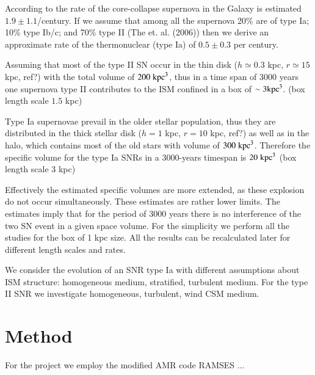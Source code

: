\documentclass[referee,oldversion]{aa}
\begin{document}
According to \citet{diehl:06} the rate of the core-collapse supernova in the Galaxy is estimated $1.9\pm1.1$/century. If we assume that among all the supernova 20\% are of type Ia;  10\% type Ib/c;  and 70\% type II (The et. al. (2006)) then we derive an approximate rate of the thermonuclear (type Ia) of $0.5\pm0.3$ per century. 


Assuming that most of the type II SN occur in the thin disk ($h \simeq 0.3$ kpc, $r \simeq 15$ kpc, ref?) with the total volume of $200 \; \mathrm{kpc}^3$, thus in a time span of 3000 years one supernova type II contributes to the ISM confined in a box of $\sim 3 \mathrm{kpc}^3$. (box length scale  $1.5$ kpc) 

Type Ia supernovae prevail in the older stellar population, thus they are distributed in the thick stellar disk ($h=1$ kpc, $r = 10$ kpc, ref?) as well as in the halo, which contains most of the old stars with volume of $300 \; \mathrm{kpc}^3$. Therefore the specific volume for the type Ia SNRs in a 3000-years timespan is $20 \; \mathrm{kpc}^3$ (box length scale $3$ kpc)

Effectively the estimated specific volumes are more extended, as these explosion do not occur simultaneously. These estimates are rather lower limits. The estimates imply that for the period of 3000 years there is no interference of the two SN event in a given space volume. For the simplicity we perform all the studies for the box of 1 kpc size. All the results can be recalculated later for different length scales and rates.

We consider the evolution of an SNR type Ia with different assumptions about ISM structure: homogeneous medium, stratified, turbulent medium. For the type II SNR we investigate homogeneous, turbulent, wind CSM medium.

\section{Method}
For the project we employ the modified \citet{ferrand} AMR code RAMSES \citet{teyssier:2002}
...



\end{document}
